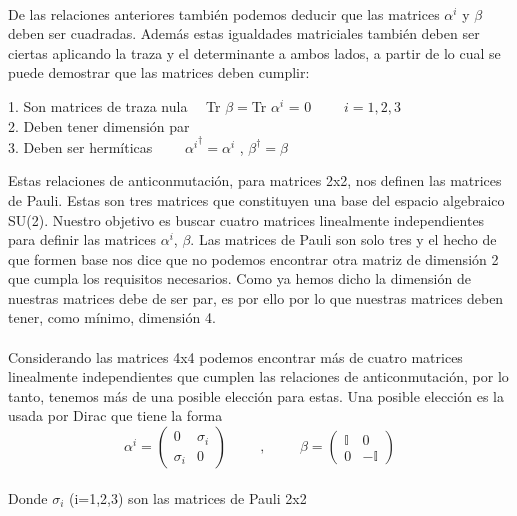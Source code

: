 \documentclass[11pt,letterpaper]{article}     %
\begin{document}
\\De las relaciones anteriores también podemos deducir que las matrices $\alpha ^i$ y $\beta$ deben ser cuadradas. Además estas igualdades matriciales también deben ser ciertas aplicando la traza y el determinante a ambos lados, a partir de lo cual se puede demostrar que las matrices deben cumplir: 
\begin{flushleft}
\hspace{3cm}1. Son matrices de traza nula $\quad$Tr $\beta=$Tr $\alpha^i$ = 0 $\qquad i=1,2,3$\\
\hspace{3cm}2. Deben tener dimensión par \\
\hspace{3cm}3. Deben ser hermíticas  $\qquad {\alpha^i}^\dagger=\alpha^i$ , $\beta^\dagger=\beta$
\end{flushleft}
\vspace{5mm}
Estas relaciones de anticonmutación, para matrices 2x2, nos definen las matrices de Pauli. Estas son tres matrices que constituyen una base del espacio algebraico SU(2). Nuestro objetivo es buscar cuatro matrices linealmente independientes para definir las matrices $\alpha^i$, $\beta$. Las matrices de Pauli son solo tres y el hecho de que formen base nos dice que no podemos encontrar otra matriz de dimensión 2 que cumpla los requisitos necesarios. Como ya hemos dicho la dimensión de nuestras matrices debe de ser par, es por ello por lo que nuestras matrices deben tener, como mínimo, dimensión 4.
\\ \\Considerando las matrices 4x4 podemos encontrar más de cuatro matrices linealmente independientes que cumplen las relaciones de anticonmutación, por lo tanto, tenemos más de una posible elección para estas. Una posible elección es la usada por Dirac que tiene la forma
\begin{equation} \label{eq:26}
\alpha^i = 
\begin{pmatrix}
0 & \sigma_i  \\
 \sigma_i & 0
\end{pmatrix} \hspace{1cm},\hspace{1cm}
\beta=
\begin{pmatrix}
\mathbb{I} & 0 \\
0 & -\mathbb{I}
\end{pmatrix}
\end{equation}
\\Donde $\sigma_i$ (i=1,2,3) son las matrices de Pauli 2x2 
\end{document}
